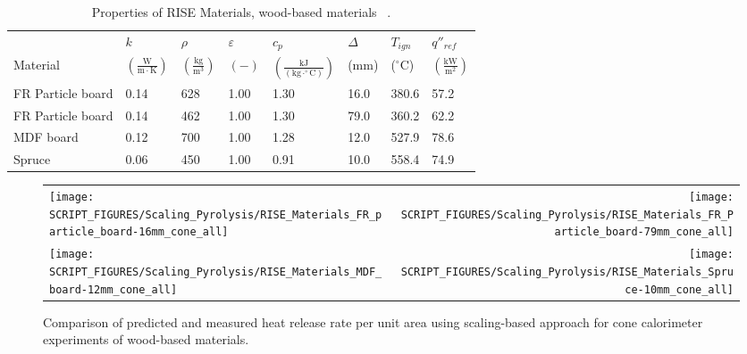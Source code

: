 \clearpage

\begin{table}[!h]
\caption[Properties of RISE Materials, wood-based materials]{Properties of RISE Materials, wood-based materials ~\cite{RISE:Fire_Database}.}
\centering
\begin{tabular}{|p{5.5cm}|p{1.0cm}|p{1.0cm}|p{0.8cm}|p{1.4cm}|p{1.0cm}|p{1.0cm}|p{1.2cm}|}
\hline
                                               & $k$    & $\rho$      & $\varepsilon$   & $c_{p}$ & $\Delta$    & $T_{ign}$ & $q''_{ref}$ \\
Material                                       & $\mathrm{\left(\frac{W}{m\cdot K}\right)}$ & $\mathrm{\left(\frac{kg}{m^{3}}\right)}$ & $\mathrm{( - )}$ & $\mathrm{\left(\frac{kJ}{(kg\cdot ^{\circ}C)}\right)}$ &  ($\mathrm{mm}$)   & ($\mathrm{^{\circ}C}$) & $\mathrm{\left(\frac{kW}{m^{2}}\right)}$ \\ \hline
\hline
FR Particle board & 0.14 & 628 & 1.00 & 1.30 & 16.0 & 380.6 & 57.2 \\ \hline
FR Particle board & 0.14 & 462 & 1.00 & 1.30 & 79.0 & 360.2 & 62.2 \\ \hline
MDF board & 0.12 & 700 & 1.00 & 1.28 & 12.0 & 527.9 & 78.6 \\ \hline
Spruce & 0.06 & 450 & 1.00 & 0.91 & 10.0 & 558.4 & 74.9 \\ \hline
\end{tabular}
\label{Properties_RISE_Materials_woods}
\end{table}

\begin{figure}[!h]
\begin{tabular*}{\textwidth}{l@{\extracolsep{\fill}}r}
\texttt{[image: SCRIPT\_FIGURES/Scaling\_Pyrolysis/RISE\_Materials\_FR\_particle\_board-16mm\_cone\_all]} &
\texttt{[image: SCRIPT\_FIGURES/Scaling\_Pyrolysis/RISE\_Materials\_FR\_Particle\_board-79mm\_cone\_all]} \\
\texttt{[image: SCRIPT\_FIGURES/Scaling\_Pyrolysis/RISE\_Materials\_MDF\_board-12mm\_cone\_all]} &
\texttt{[image: SCRIPT\_FIGURES/Scaling\_Pyrolysis/RISE\_Materials\_Spruce-10mm\_cone\_all]} \\
\end{tabular*}
\caption[HRRPUA of RISE materials using scaling model, wood-based materials]
{Comparison of predicted and measured heat release rate per unit area using scaling-based approach for cone calorimeter experiments of wood-based materials.}
\label{RISE_Materials_woods1}
\end{figure}

